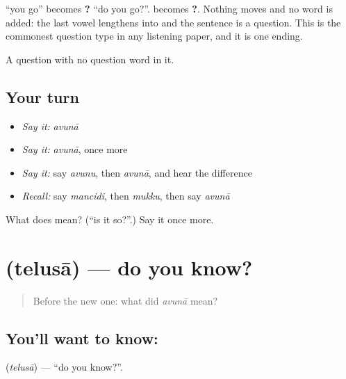 \begin{grammarlens}[title={Grammar Lens: -\te{ఆ} makes any statement a question}]
\textbf{ } \textquotedblleft{}you go\textquotedblright{} becomes \textbf{ ?} \textquotedblleft{}do you go?\textquotedblright{}. \textbf{ } becomes \textbf{ ?}. Nothing moves and no word is added: the last vowel lengthens into  and the sentence is a question. This is the commonest question type in any listening paper, and it is one ending.
\end{grammarlens}

\begin{grammarlens}[title={What you've built}]
A question with no question word in it.
\end{grammarlens}

\subsection*{Your turn}
\begin{itemize}
\raggedright
  \item \emph{Say it:} \emph{avunā}
  \item \emph{Say it:} \emph{avunā}, once more
  \item \emph{Say it:} say \emph{avunu}, then \emph{avunā}, and hear the difference
  \item \emph{Recall:} say \emph{mancidi}, then \emph{mukku}, then say \emph{avunā}
\end{itemize}

\begin{tcolorbox}[breakable,colback=teal!4,colframe=teal!35!black,title={Before you move on}]
What does  mean? (\textquotedblleft{}is it so?\textquotedblright{}.) Say it once more.
\end{tcolorbox}
\section[\texorpdfstring{\te{తెలుసా} (telusā)}{తెలుసా (telusā)}]{ (telusā) — do you know?}

\label{lesson:TE-C78-doyouknow}



\begin{quote}
Before the new one: what did \emph{avunā} mean?
\end{quote}

\subsection*{You'll want to know: }
\textbf{} (\emph{telusā}) — \textquotedblleft{}do you know?\textquotedblright{}.

